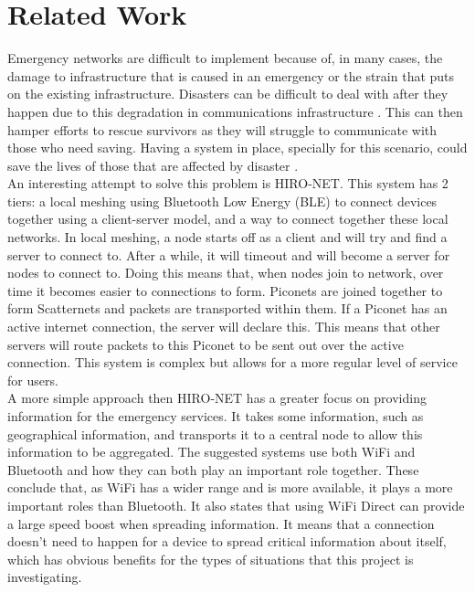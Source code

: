 \documentclass{report}
\begin{document}
\section{Related Work}
Emergency networks are difficult to implement because of, in many cases, the damage to infrastructure that is caused in an emergency or the strain that puts on the existing infrastructure. Disasters can be difficult to deal with after they happen due to this degradation in communications infrastructure \cite{nprDorian}. This can then hamper efforts to rescue survivors as they will struggle to communicate with those who need saving. Having a system in place, specially for this scenario, could save the lives of those that are affected by disaster \cite{sciAmHurr}. 
\bigskip\\
An interesting attempt to solve this problem is HIRO-NET\cite{ferranti2019hiro}. This system has 2 tiers: a local meshing using Bluetooth Low Energy (BLE) to connect devices together using a client-server model, and a way to connect together these local networks. In local meshing, a node starts off as a client and will try and find a server to connect to. After a while, it will timeout and will become a server for nodes to connect to. Doing this means that, when nodes join to network, over time it becomes easier to connections to form. Piconets are joined together to form Scatternets and packets are transported within them. If a Piconet has an active internet connection, the server will declare this. This means that other servers will route packets to this Piconet to be sent out over the active connection. This system is complex but allows for a more regular level of service for users.
\bigskip\\
A more simple approach then HIRO-NET has a greater focus on providing information for the emergency services\cite{wu2011emergency, shahin2015alert}. It takes some information, such as geographical information, and transports it to a central node to allow this information to be aggregated. The suggested systems use both WiFi and Bluetooth and how they can both play an important role together. These conclude that, as WiFi has a wider range and is more available, it plays a more important roles than Bluetooth. It also states that using WiFi Direct can provide a large speed boost when spreading information\cite{shahin2015alert}. It means that a connection doesn't need to happen for a device to spread critical information about itself, which has obvious benefits for the types of situations that this project is investigating. 
\bigskip\\
\end{document}
